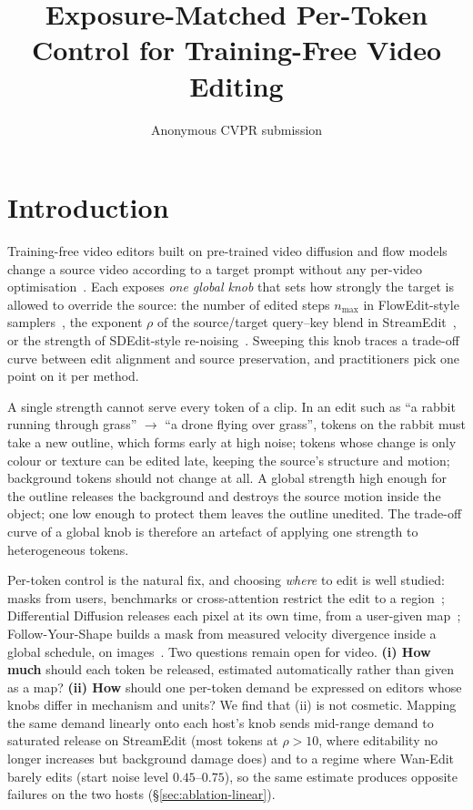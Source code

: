 \documentclass[10pt,twocolumn]{article}
\title{Exposure-Matched Per-Token Control for Training-Free Video Editing}
\author{Anonymous CVPR submission}
\date{}
\begin{document}
\maketitle

\section{Introduction}

Training-free video editors built on pre-trained video diffusion and flow models~\cite{wan2025,selfforcing2025} change a source video according to a target prompt without any per-video optimisation~\cite{flowedit2025,streamedit2026,tokenflow2024}. Each exposes \emph{one global knob} that sets how strongly the target is allowed to override the source: the number of edited steps $n_{\max}$ in FlowEdit-style samplers~\cite{flowedit2025,flowdirector2026}, the exponent $\rho$ of the source/target query--key blend in StreamEdit~\cite{streamedit2026}, or the strength of SDEdit-style re-noising~\cite{sdedit2022}. Sweeping this knob traces a trade-off curve between edit alignment and source preservation, and practitioners pick one point on it per method.

A single strength cannot serve every token of a clip. In an edit such as ``a rabbit running through grass'' $\rightarrow$ ``a drone flying over grass'', tokens on the rabbit must take a new outline, which forms early at high noise; tokens whose change is only colour or texture can be edited late, keeping the source's structure and motion; background tokens should not change at all. A global strength high enough for the outline releases the background and destroys the source motion inside the object; one low enough to protect them leaves the outline unedited. The trade-off curve of a global knob is therefore an artefact of applying one strength to heterogeneous tokens.

Per-token control is the natural fix, and choosing \emph{where} to edit is well studied: masks from users, benchmarks or cross-attention restrict the edit to a region~\cite{diffedit2023,p2p2023}; Differential Diffusion releases each pixel at its own time, from a user-given map~\cite{diffdiff}; Follow-Your-Shape builds a mask from measured velocity divergence inside a global schedule, on images~\cite{followyourshape}. Two questions remain open for video. \textbf{(i) How much} should each token be released, estimated automatically rather than given as a map? \textbf{(ii) How} should one per-token demand be expressed on editors whose knobs differ in mechanism and units? We find that (ii) is not cosmetic. Mapping the same demand linearly onto each host's knob sends mid-range demand to saturated release on StreamEdit (most tokens at $\rho>10$, where editability no longer increases but background damage does) and to a regime where Wan-Edit~\cite{five2025} barely edits (start noise level $0.45$--$0.75$), so the same estimate produces opposite failures on the two hosts (\S\ref{sec:ablation-linear}).
\end{document}
